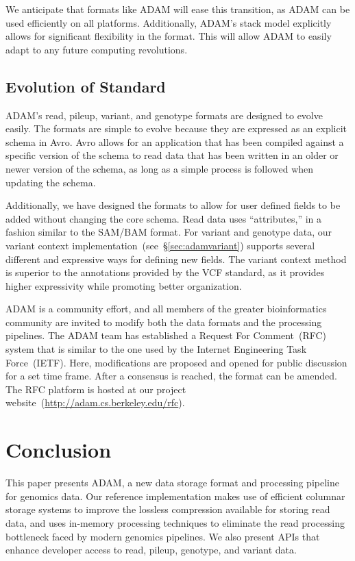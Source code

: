 \documentclass{bioinfo}
\begin{document}
We anticipate that formats like ADAM will ease this transition, as ADAM can be used efficiently on all platforms. Additionally, ADAM's stack model explicitly allows for significant
flexibility in the format. This will allow ADAM to easily adapt to any future computing revolutions.

\subsection{Evolution of Standard}
\label{sec:evolution-of-standard}

ADAM's read, pileup, variant, and genotype formats are designed to evolve easily. The formats are simple to evolve because they are expressed as an explicit schema
in Avro. Avro allows for an application that has been compiled against a specific version of the schema to read data that has been written in an older or newer version of the
schema, as long as a simple process is followed when updating the schema.

Additionally, we have designed the formats to allow for user defined fields to be added without changing the core schema. Read data uses ``attributes,'' in a fashion similar to
the SAM/BAM format. For variant and genotype data, our variant context implementation~(see~\S\ref{sec:adamvariant}) supports several different and expressive ways for
defining new fields. The variant context method is superior to the annotations provided by the VCF standard, as it provides higher expressivity while promoting better
organization.

ADAM is a community effort, and all members of the greater bioinformatics community are invited to modify both the data formats and the processing pipelines. The ADAM team
has established a Request For Comment~(RFC) system that is similar to the one used by the Internet Engineering Task Force~(IETF). Here, modifications are proposed and
opened for public discussion for a set time frame. After a consensus is reached, the format can be amended. The RFC platform is hosted at our project
website~(\url{http://adam.cs.berkeley.edu/rfc}).

\section{Conclusion}
\label{sec:conclusion}

This paper presents ADAM, a new data storage format and processing pipeline for genomics data. Our reference implementation makes use of efficient columnar storage
systems to improve the lossless compression available for storing read data, and uses in-memory processing techniques to eliminate the read processing bottleneck faced by
modern genomics pipelines. We also present APIs that enhance developer access to read, pileup, genotype, and variant data.
\end{document}
